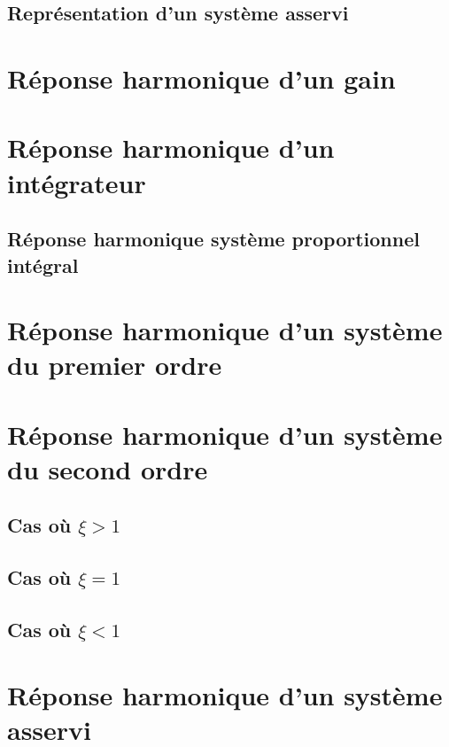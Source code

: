\documentclass[10pt,oneside]{article}
\begin{document}
\subsection{Représentation d'un système asservi}

\section{Réponse harmonique d'un gain}

\section{Réponse harmonique d'un intégrateur}

\subsection{Réponse harmonique système proportionnel intégral}

\section{Réponse harmonique d'un système du premier ordre}

\section{Réponse harmonique d'un système du second ordre}

\subsection{Cas où $\xi>1$}
\subsection{Cas où $\xi=1$}
\subsection{Cas où $\xi<1$}
\section{Réponse harmonique d'un système asservi}

\begin{thebibliography}{2}

\end{thebibliography}
\end{document}
